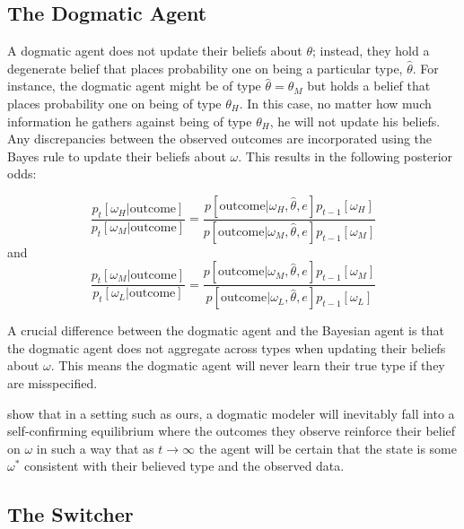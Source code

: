 \documentclass[
  12pt,
]{article}
\begin{document}
\hypertarget{the-dogmatic-agent}{%
\subsection{The Dogmatic Agent}\label{the-dogmatic-agent}}

A dogmatic agent does not update their beliefs about \(\theta\);
instead, they hold a degenerate belief that places probability one on
being a particular type, \(\hat{\theta}\). For instance, the dogmatic
agent might be of type \(\hat{\theta} = \theta_M\) but holds a belief
that places probability one on being of type \(\theta_H\). In this case,
no matter how much information he gathers against being of type
\(\theta_H\), he will not update his beliefs. Any discrepancies between
the observed outcomes are incorporated using the Bayes rule to update
their beliefs about \(\omega\). This results in the following posterior
odds:

\begin{equation}
\frac{p_{t}[\omega_H|\text{outcome}]}{p_{t}[\omega_M|\text{outcome}]} = 
      \frac{p[\text{outcome}|\omega_H, \hat{\theta}, e]p_{t-1}[\omega_H]}{p[\text{outcome}|\omega_M, \hat{\theta}, e]p_{t-1}[\omega_M]}
\end{equation} and \begin{equation}
\frac{p_{t}[\omega_M|\text{outcome}]}{p_{t}[\omega_L|\text{outcome}]} = 
      \frac{p[\text{outcome}|\omega_M, \hat{\theta}, e]p_{t-1}[\omega_M]}{p[\text{outcome}|\omega_L, \hat{\theta}, e]p_{t-1}[\omega_L]}
\end{equation}

A crucial difference between the dogmatic agent and the Bayesian agent
is that the dogmatic agent does not aggregate across types when updating
their beliefs about \(\omega\). This means the dogmatic agent will never
learn their true type if they are misspecified.

\citet{Heidhues2018} show that in a setting such as ours, a dogmatic
modeler will inevitably fall into a self-confirming equilibrium where
the outcomes they observe reinforce their belief on \(\omega\) in such a
way that as \(t\to\infty\) the agent will be certain that the state is
some \(\omega^*\) consistent with their believed type and the observed
data.

\hypertarget{the-switcher}{%
\subsection{The Switcher}\label{the-switcher}}
\end{document}
